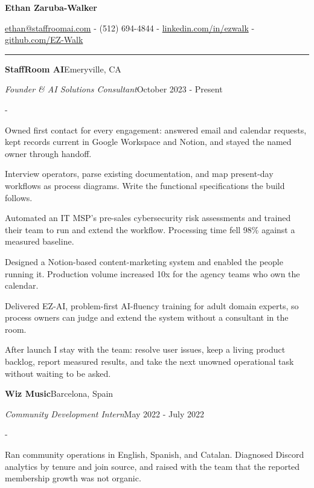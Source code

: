 \documentclass[10pt,letterpaper]{article}
\newenvironment{cvitems}{%
  \begin{list}{-}{%
    \setlength{\leftmargin}{12pt}%
    \setlength{\itemsep}{1.2pt}%
    \setlength{\parsep}{0pt}%
    \setlength{\topsep}{1.5pt}%
    \setlength{\partopsep}{0pt}%
    \setlength{\labelwidth}{6pt}%
    \setlength{\labelsep}{6pt}%
    \setlength{\itemindent}{0pt}%
  }%
}{\end{list}}
\newcommand{\cvsection}[1]{%
  \vspace{7pt}%
  \noindent{\bfseries\fontsize{11pt}{13pt}\selectfont\MakeUppercase{#1}}\par
  \vspace{1pt}%
  \noindent\rule{\textwidth}{0.4pt}\par
  \vspace{4pt}%
}
\newcommand{\cventryhead}[4]{%
  \noindent\textbf{#1}\hfill#2\par
  \vspace{0.5pt}%
  \noindent\textit{#3}\hfill#4\par
}
\begin{document}
\begin{center}
  {\bfseries\fontsize{22pt}{24pt}\selectfont Ethan Zaruba-Walker\par}
  \vspace{4pt}
  {\fontsize{10pt}{12pt}\selectfont
    \href{mailto:ethan@staffroomai.com}{ethan@staffroomai.com}
    {-}
    (512) 694-4844
    {-}
    \href{https://linkedin.com/in/ezwalk}{linkedin.com/in/ezwalk}
    {-}
    \href{https://github.com/EZ-Walk}{github.com/EZ-Walk}\par}
\end{center}
\vspace{2pt}

\cvsection{Experience}

\cventryhead{StaffRoom AI}{Emeryville, CA}
{Founder \& AI Solutions Consultant}{October 2023 - Present}
\begin{cvitems}
  \item Owned first contact for every engagement: answered email and calendar requests, kept records current in Google Workspace and Notion, and stayed the named owner through handoff.
  \item Interview operators, parse existing documentation, and map present-day workflows as process diagrams. Write the functional specifications the build follows.
  \item Automated an IT MSP's pre-sales cybersecurity risk assessments and trained their team to run and extend the workflow. Processing time fell 98\% against a measured baseline.
  \item Designed a Notion-based content-marketing system and enabled the people running it. Production volume increased 10x for the agency teams who own the calendar.
  \item Delivered EZ-AI, problem-first AI-fluency training for adult domain experts, so process owners can judge and extend the system without a consultant in the room.
  \item After launch I stay with the team: resolve user issues, keep a living product backlog, report measured results, and take the next unowned operational task without waiting to be asked.
\end{cvitems}

\vspace{3pt}
\cventryhead{Wiz Music}{Barcelona, Spain}
{Community Development Intern}{May 2022 - July 2022}
\begin{cvitems}
  \item Ran community operations in English, Spanish, and Catalan. Diagnosed Discord analytics by tenure and join source, and raised with the team that the reported membership growth was not organic.
\end{cvitems}
\end{document}
